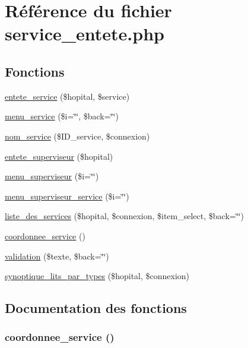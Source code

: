 \hypertarget{service__entete_8php}{
\section{R\'{e}f\'{e}rence du fichier service\_\-entete.php}
\label{service__entete_8php}
}
\subsection*{Fonctions}
\begin{CompactItemize}
\item 
\hyperlink{service__entete_8php_a0}{entete\_\-service} (\$hopital, \$service)
\item 
\hyperlink{service__entete_8php_a1}{menu\_\-service} (\$i=\char`\"{}\char`\"{}, \$back=\char`\"{}\char`\"{})
\item 
\hyperlink{service__entete_8php_a2}{nom\_\-service} (\$ID\_\-service, \$connexion)
\item 
\hyperlink{service__entete_8php_a3}{entete\_\-superviseur} (\$hopital)
\item 
\hyperlink{service__entete_8php_a4}{menu\_\-superviseur} (\$i=\char`\"{}\char`\"{})
\item 
\hyperlink{service__entete_8php_a5}{menu\_\-superviseur\_\-service} (\$i=\char`\"{}\char`\"{})
\item 
\hyperlink{service__entete_8php_a6}{liste\_\-des\_\-services} (\$hopital, \$connexion, \$item\_\-select, \$back=\char`\"{}\char`\"{})
\item 
\hyperlink{service__entete_8php_a7}{coordonnee\_\-service} ()
\item 
\hyperlink{service__entete_8php_a8}{validation} (\$texte, \$back=\char`\"{}\char`\"{})
\item 
\hyperlink{service__entete_8php_a9}{synoptique\_\-lits\_\-par\_\-types} (\$hopital, \$connexion)
\end{CompactItemize}


\subsection{Documentation des fonctions}
\hypertarget{service__entete_8php_a7}{
\subsubsection[coordonnee\_\-service]{\setlength{\rightskip}{0pt plus 5cm}coordonnee\_\-service ()}}
\label{service__entete_8php_a7}


